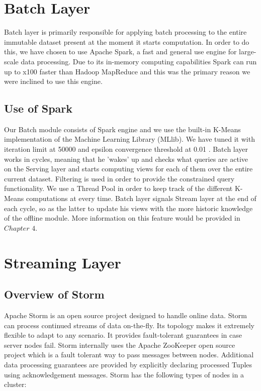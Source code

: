 \documentclass{lmproj}
\begin{document}
\section{Batch Layer}
\label{systemdescr}

Batch layer is primarily responsible for applying batch processing to the entire immutable dataset present at the moment it starts computation. In order to do this, we have chosen to use Apache Spark, a fast and general use engine for large-scale data processing. Due to its in-memory computing capabilities Spark can run up to x100 faster than Hadoop MapReduce and this was the primary reason we were inclined to use this engine.

\subsection{Use of Spark}

Our Batch module consists of Spark engine and we use the built-in K-Means implementation of the Machine Learning Library (MLlib). We have tuned it with iteration limit at 50000 and epsilon convergence threshold at 0.01 . Batch layer works in cycles, meaning that he 'wakes' up and checks what queries are active on the Serving layer and starts computing views for each of them over the entire current dataset. Filtering is used in order to provide the constrained query functionality. We use a Thread Pool in order to keep track of the different K-Means computations at every time. Batch layer signals Stream layer at the end of each cycle, so as the latter to update his views with the more historic knowledge of the offline module. More information on this feature would be provided in $Chapter$ $4$. 



\section{Streaming Layer}
\label{systemdescr}

\subsection{Overview of Storm}

Apache Storm is an open source project designed to handle online data. Storm can process continued streams of data on-the-fly.  Its topology makes it extremely flexible to adapt to any scenario. It provides fault-tolerant guarantees in case server nodes fail. Storm internally uses the Apache ZooKeeper open source project which is a fault tolerant way to pass messages between nodes. Additional data processing guarantees are provided by explicitly declaring processed Tuples using acknowledgement messages. Storm has the following types of nodes in a cluster:
\end{document}
